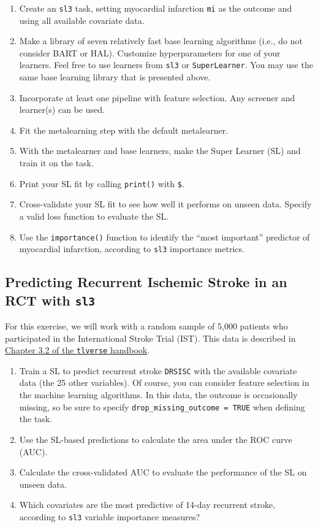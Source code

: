 \documentclass[12pt, krantz2,]{book}
\providecommand{\tightlist}{%
  \setlength{\itemsep}{0pt}\setlength{\parskip}{0pt}}
\theoremstyle{definition}
\theoremstyle{definition}
\theoremstyle{definition}
\newcommand{\1}{\mathbbm{1}}
\begin{document}
\begin{enumerate}
\def\labelenumi{\arabic{enumi}.}
\tightlist
\item
  Create an \texttt{sl3} task, setting myocardial infarction \texttt{mi} as the outcome and
  using all available covariate data.
\item
  Make a library of seven relatively fast base learning algorithms (i.e., do
  not consider BART or HAL). Customize hyperparameters for one of your
  learners. Feel free to use learners from \texttt{sl3} or \texttt{SuperLearner}. You may
  use the same base learning library that is presented above.
\item
  Incorporate at least one pipeline with feature selection. Any screener and
  learner(s) can be used.
\item
  Fit the metalearning step with the default metalearner.
\item
  With the metalearner and base learners, make the Super Learner (SL) and
  train it on the task.
\item
  Print your SL fit by calling \texttt{print()} with \texttt{\$}.
\item
  Cross-validate your SL fit to see how well it performs on unseen
  data. Specify a valid loss function to evaluate the SL.
\item
  Use the \texttt{importance()} function to identify the ``most important'' predictor of
  myocardial infarction, according to \texttt{sl3} importance metrics.
\end{enumerate}

\hypertarget{sl3ex2}{%
\subsection{\texorpdfstring{Predicting Recurrent Ischemic Stroke in an RCT with \texttt{sl3}}{Predicting Recurrent Ischemic Stroke in an RCT with sl3}}\label{sl3ex2}}

For this exercise, we will work with a random sample of 5,000 patients who
participated in the International Stroke Trial (IST). This data is described in
\href{https://tlverse.org/tlverse-handbook/data.html\#ist}{Chapter 3.2 of the \texttt{tlverse}
handbook}.

\begin{enumerate}
\def\labelenumi{\arabic{enumi}.}
\tightlist
\item
  Train a SL to predict recurrent stroke \texttt{DRSISC} with the available covariate
  data (the 25 other variables). Of course, you can consider feature selection
  in the machine learning algorithms. In this data, the outcome is
  occasionally missing, so be sure to specify \texttt{drop\_missing\_outcome\ =\ TRUE}
  when defining the task.
\item
  Use the SL-based predictions to calculate the area under the ROC curve
  (AUC).
\item
  Calculate the cross-validated AUC to evaluate the performance of the
  SL on unseen data.
\item
  Which covariates are the most predictive of 14-day recurrent stroke,
  according to \texttt{sl3} variable importance measures?
\end{enumerate}
\end{document}
